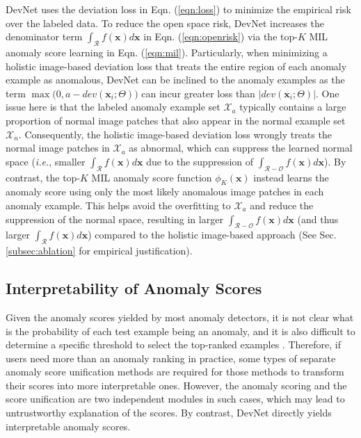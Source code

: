 \documentclass[10pt,journal,compsoc]{IEEEtran}
\newcommand{\ie}{\textit{i.e.}}
\newcommand{\xvec}{{\mathbf{x}}}
\begin{document}
DevNet uses the deviation loss in Eqn. (\ref{eqn:loss}) to minimize the empirical risk over the labeled data. To reduce the open space risk, DevNet increases the denominator term $\int_{\mathcal{R}}f(\xvec)d\xvec$ in Eqn. (\ref{eqn:openrisk}) via the top-$K$ MIL anomaly score learning in Eqn. (\ref{eqn:mil}). Particularly, when minimizing a holistic image-based deviation loss that treats the entire region of each anomaly example as anomalous, DevNet can be inclined to the anomaly examples as the term $\max\big(0, a - \mathit{dev}(\mathbf{x}_{i};\Theta)\big)$ can incur greater loss than $|\mathit{dev}(\mathbf{x}_{i};\Theta)|$. One issue here is that the labeled anomaly example set $\mathcal{X}_a$ typically contains a large proportion of normal image patches that also appear in the normal example set $\mathcal{X}_n$. Consequently, the holistic image-based deviation loss wrongly treats the normal image patches in $\mathcal{X}_a$ as abnormal, which can suppress the learned normal space (\ie, smaller $\int_{\mathcal{R}}f(\xvec)d\xvec$ due to the suppression of $\int_{\mathcal{R}-\mathcal{O}}f(\xvec)d\xvec$).
By contrast, the top-$K$ MIL anomaly score function $\phi_K(\xvec)$ instead learns the anomaly score using only the most likely anomalous image patches in each anomaly example. This helps avoid the overfitting to $\mathcal{X}_a$ and reduce the suppression of the normal space, resulting in larger $\int_{\mathcal{R}-\mathcal{O}}f(\xvec)d\xvec$ (and thus larger $\int_{\mathcal{R}}f(\xvec)d\xvec$) compared to the holistic image-based approach (See Sec. \ref{subsec:ablation} for empirical justification). 



\subsection{Interpretability of Anomaly Scores} \label{subsec:interpretability_score}
Given the anomaly scores yielded by most anomaly detectors, it is not clear what is the probability of each test example being an anomaly, and it is also difficult to determine a specific threshold to select the top-ranked examples \cite{kriegel2011interpreting}. Therefore, if users need more than an anomaly ranking in practice, some types of separate anomaly score unification methods \cite{kriegel2011interpreting} are required for those methods to transform their scores into more interpretable ones. However, the anomaly scoring and the score unification are two independent modules in such cases, which may lead to untrustworthy explanation of the scores. By contrast, DevNet directly yields interpretable anomaly scores.
\end{document}

